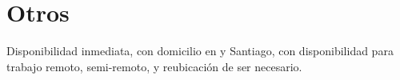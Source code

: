 \documentclass{my_cv}
\begin{document}
\section{Otros \faPaperPlane}
Disponibilidad inmediata, con domicilio en {\valpo}  y Santiago, con disponibilidad para trabajo remoto, semi-remoto, y reubicaci\'on de ser necesario. 

\end{document}
